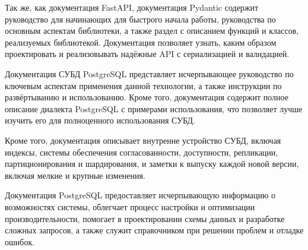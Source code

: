 Так же, как документация FastAPI, документация Pydantic содержит руководство для начинающих для быстрого начала работы, руководства по основным аспектам библиотеки, а также раздел с описанием функций и классов, реализуемых библиотекой. Документация позволяет узнать, каким образом проектировать и реализовывать надёжные API с сериализацией и валидацией.


Документация СУБД PostgreSQL представляет исчерпывающее руководство по ключевым аспектам применения данной технологии, а также инструкции по развёртыванию и использованию. Кроме того, документация содержит полное описание диалекта PostgreSQL с примерами использования, что позволяет лучше изучить его для полноценного использования СУБД.

Кроме того, документация описывает внутренне устройство СУБД, включая индексы, системы обеспечения согласованности, доступности, репликации, партиционирования и шардирования, и заметки к выпуску каждой новой версии, включая мелкие и крупные изменения.

Документация PostgreSQL предоставляет исчерпывающую информацию о возможностях системы, облегчает процесс настройки и оптимизации производительности, помогает в проектировании схемы данных и разработке сложных запросов, а также служит справочником при решении проблем и отладке ошибок.
